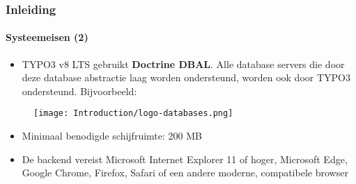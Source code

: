 \begin{frame}[fragile]
	\frametitle{Inleiding}
	\framesubtitle{Systeemeisen (2)}

	\begin{itemize}
		\item TYPO3 v8 LTS gebruikt \textbf{Doctrine DBAL}. Alle database servers
			die door deze database abstractie laag worden ondersteund, worden ook door TYPO3 ondersteund.\newline
			Bijvoorbeeld:
	\end{itemize}

	\vspace{-0.4cm}
	\begin{figure}
		\texttt{[image: Introduction/logo-databases.png]}
	\end{figure}

	\begin{itemize}

		\item Minimaal benodigde schijfruimte: 200 MB
		\item De backend vereist Microsoft Internet Explorer 11 of hoger,
			Microsoft Edge, Google Chrome, Firefox, Safari
			of een andere moderne, compatibele browser

	\end{itemize}

\end{frame}


